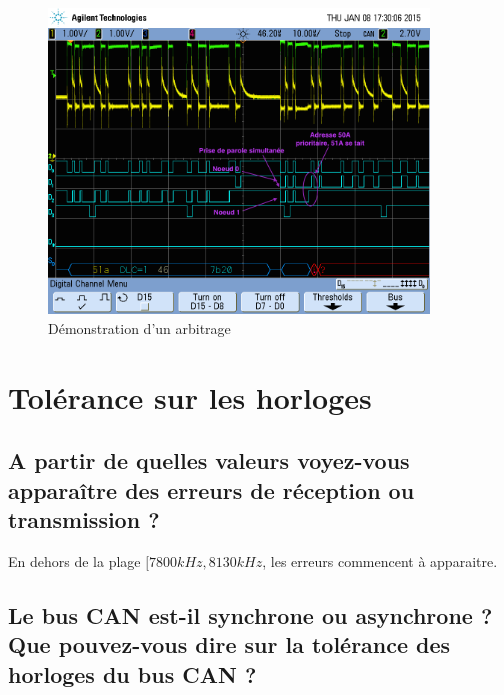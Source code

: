 \documentclass[12pt]{article}
\begin{document}
\begin{figure}[H]
\centering
\includegraphics[width=0.9\textwidth]{releve_2.png}
\caption{Démonstration d'un arbitrage}
\end{figure}

\section{Tolérance sur les horloges}

\subsection{A partir de quelles valeurs voyez-vous apparaître des erreurs de réception ou transmission ?}

En dehors de la plage $[7800kHz, 8130kHz$, les erreurs commencent à apparaitre.

\subsection{Le bus CAN est-il synchrone ou asynchrone ? Que pouvez-vous dire sur la tolérance des horloges du bus CAN ?}
\end{document}
